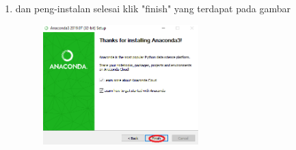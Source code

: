 \begin{enumerate}
	\item dan peng-instalan selesai klik "finish" yang terdapat pada gambar 
	\begin{figure} [h]
	\includegraphics[width=6cm]{python/10.png}
	\centering
	\end{figure}

\end{enumerate}

